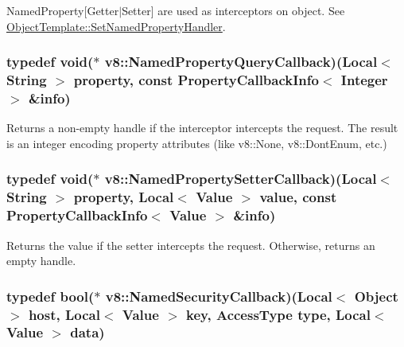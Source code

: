 Named\-Property\mbox{[}Getter$|$\-Setter\mbox{]} are used as interceptors on object. See \hyperlink{classv8_1_1ObjectTemplate_ac7bcbb6e2936ab38490680f7e1bfb787}{Object\-Template\-::\-Set\-Named\-Property\-Handler}. \hypertarget{namespacev8_a4898f3b36dba46aa71ee27fdeaa97d23}{
\subsubsection[{Named\-Property\-Query\-Callback}]{\setlength{\rightskip}{0pt plus 5cm}typedef void($\ast$ v8\-::\-Named\-Property\-Query\-Callback)({\bf Local}$<$ {\bf String} $>$ property, const {\bf Property\-Callback\-Info}$<$ {\bf Integer} $>$ \&info)}}\label{namespacev8_a4898f3b36dba46aa71ee27fdeaa97d23}
Returns a non-\/empty handle if the interceptor intercepts the request. The result is an integer encoding property attributes (like v8\-::\-None, v8\-::\-Dont\-Enum, etc.) \hypertarget{namespacev8_acdec7bf35a4829e093c715f06abedb04}{
\subsubsection[{Named\-Property\-Setter\-Callback}]{\setlength{\rightskip}{0pt plus 5cm}typedef void($\ast$ v8\-::\-Named\-Property\-Setter\-Callback)({\bf Local}$<$ {\bf String} $>$ property, {\bf Local}$<$ {\bf Value} $>$ value, const {\bf Property\-Callback\-Info}$<$ {\bf Value} $>$ \&info)}}\label{namespacev8_acdec7bf35a4829e093c715f06abedb04}
Returns the value if the setter intercepts the request. Otherwise, returns an empty handle. \hypertarget{namespacev8_a43a0aeee2c3f33b123957ec1273c87db}{
\subsubsection[{Named\-Security\-Callback}]{\setlength{\rightskip}{0pt plus 5cm}typedef bool($\ast$ v8\-::\-Named\-Security\-Callback)({\bf Local}$<$ {\bf Object} $>$ host, {\bf Local}$<$ {\bf Value} $>$ key, {\bf Access\-Type} type, {\bf Local}$<$ {\bf Value} $>$ data)}}\label{namespacev8_a43a0aeee2c3f33b123957ec1273c87db}
